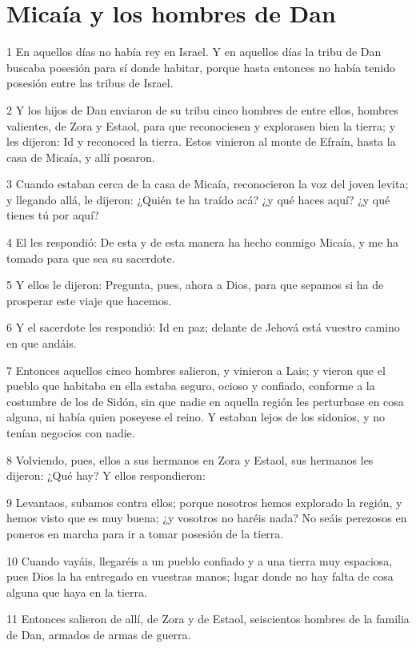 \section*{Micaía y los hombres de Dan}

\par 1 En aquellos días no había rey en Israel. Y en aquellos días la tribu de Dan buscaba posesión para sí donde habitar, porque hasta entonces no había tenido posesión entre las tribus de Israel.
\par 2 Y los hijos de Dan enviaron de su tribu cinco hombres de entre ellos, hombres valientes, de Zora y Estaol, para que reconociesen y explorasen bien la tierra; y les dijeron: Id y reconoced la tierra. Estos vinieron al monte de Efraín, hasta la casa de Micaía, y allí posaron.
\par 3 Cuando estaban cerca de la casa de Micaía, reconocieron la voz del joven levita; y llegando allá, le dijeron: ¿Quién te ha traído acá? ¿y qué haces aquí? ¿y qué tienes tú por aquí?
\par 4 El les respondió: De esta y de esta manera ha hecho conmigo Micaía, y me ha tomado para que sea su sacerdote.
\par 5 Y ellos le dijeron: Pregunta, pues, ahora a Dios, para que sepamos si ha de prosperar este viaje que hacemos.
\par 6 Y el sacerdote les respondió: Id en paz; delante de Jehová está vuestro camino en que andáis.
\par 7 Entonces aquellos cinco hombres salieron, y vinieron a Lais; y vieron que el pueblo que habitaba en ella estaba seguro, ocioso y confiado, conforme a la costumbre de los de Sidón, sin que nadie en aquella región les perturbase en cosa alguna, ni había quien poseyese el reino. Y estaban lejos de los sidonios, y no tenían negocios con nadie.
\par 8 Volviendo, pues, ellos a sus hermanos en Zora y Estaol, sus hermanos les dijeron: ¿Qué hay? Y ellos respondieron:
\par 9 Levantaos, subamos contra ellos; porque nosotros hemos explorado la región, y hemos visto que es muy buena; ¿y vosotros no haréis nada? No seáis perezosos en poneros en marcha para ir a tomar posesión de la tierra.
\par 10 Cuando vayáis, llegaréis a un pueblo confiado y a una tierra muy espaciosa, pues Dios la ha entregado en vuestras manos; lugar donde no hay falta de cosa alguna que haya en la tierra.
\par 11 Entonces salieron de allí, de Zora y de Estaol, seiscientos hombres de la familia de Dan, armados de armas de guerra.
